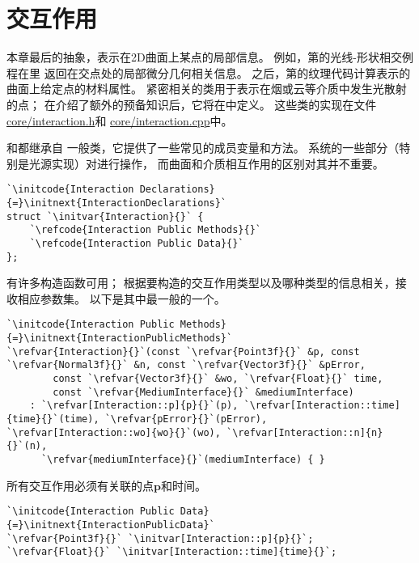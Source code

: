 \section{交互作用}\label{sec:交互作用}

本章最后的抽象，表示在2D曲面上某点的局部信息。
例如，第的光线-形状相交例程在里
返回在交点处的局部微分几何相关信息。
之后，第的纹理代码计算表示的曲面上给定点的材料属性。
紧密相关的类用于表示在烟或云等介质中发生光散射的点；
在介绍了额外的预备知识后，它将在中定义。
这些类的实现在文件\href{https://github.com/mmp/pbrt-v3/tree/master/src/core/interaction.h}{\ttfamily core/interaction.h}和
\href{https://github.com/mmp/pbrt-v3/tree/master/src/core/interaction.cpp}{\ttfamily core/interaction.cpp}中。

和都继承自
一般类，它提供了一些常见的成员变量和方法。
系统的一些部分（特别是光源实现）对进行操作，
而曲面和介质相互作用的区别对其并不重要。

\begin{lstlisting}
`\initcode{Interaction Declarations}{=}\initnext{InteractionDeclarations}`
struct `\initvar{Interaction}{}` {
    `\refcode{Interaction Public Methods}{}`
    `\refcode{Interaction Public Data}{}`
};
\end{lstlisting}

有许多构造函数可用；
根据要构造的交互作用类型以及哪种类型的信息相关，接收相应参数集。
以下是其中最一般的一个。
\begin{lstlisting}
`\initcode{Interaction Public Methods}{=}\initnext{InteractionPublicMethods}`
`\refvar{Interaction}{}`(const `\refvar{Point3f}{}` &p, const `\refvar{Normal3f}{}` &n, const `\refvar{Vector3f}{}` &pError,
        const `\refvar{Vector3f}{}` &wo, `\refvar{Float}{}` time,
        const `\refvar{MediumInterface}{}` &mediumInterface)
    : `\refvar[Interaction::p]{p}{}`(p), `\refvar[Interaction::time]{time}{}`(time), `\refvar{pError}{}`(pError), `\refvar[Interaction::wo]{wo}{}`(wo), `\refvar[Interaction::n]{n}{}`(n),
      `\refvar{mediumInterface}{}`(mediumInterface) { }
\end{lstlisting}

所有交互作用必须有关联的点$\bm p$和时间。
\begin{lstlisting}
`\initcode{Interaction Public Data}{=}\initnext{InteractionPublicData}`
`\refvar{Point3f}{}` `\initvar[Interaction::p]{p}{}`;
`\refvar{Float}{}` `\initvar[Interaction::time]{time}{}`;
\end{lstlisting}

